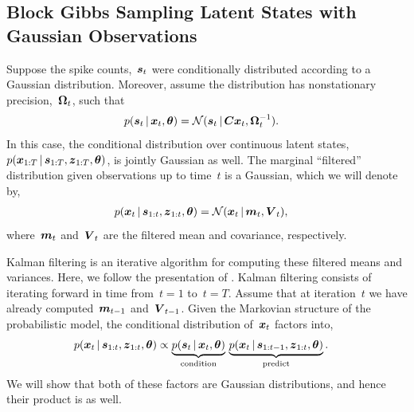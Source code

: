 \subsection{Block Gibbs Sampling Latent States with Gaussian Observations}
Suppose the spike counts,~$\boldsymbol{s}_t$ were conditionally distributed
according to a Gaussian distribution. Moreover, assume the
distribution has nonstationary precision,~$\boldsymbol{\Omega}_t$, such that
\begin{align}
  \label{eq:gauss_lkhd}
  p(\boldsymbol{s}_t \,|\, \boldsymbol{x}_t, \boldsymbol{\theta}) 
  &=
  \mathcal{N}(\boldsymbol{s}_t \,|\, \boldsymbol{C} \boldsymbol{x}_t, \boldsymbol{\Omega}_t^{-1}).
\end{align}
In this case, the conditional distribution over continuous latent
states,~${p(\boldsymbol{x}_{1:T} \,|\, \boldsymbol{s}_{1:T}, \boldsymbol{z}_{1:T}, \boldsymbol{\theta})}$, is
jointly Gaussian as well.  The marginal ``filtered'' distribution
given observations up to time~$t$ is a Gaussian, which we will denote
by,
\begin{align*}
  p(\boldsymbol{x}_t \,|\, \boldsymbol{s}_{1:t}, \boldsymbol{z}_{1:t}, \boldsymbol{\theta}) &= \mathcal{N}(\boldsymbol{x}_t \,|\, \boldsymbol{m}_t, \boldsymbol{V}_t),
\end{align*}
where~$\boldsymbol{m}_t$ and~$\boldsymbol{V}_t$ are the filtered mean and covariance, respectively.

Kalman filtering is an iterative algorithm for computing these filtered means 
and variances. 
Here, we follow the presentation of
\citet[Chapter 18]{murphy2012probabilistic}.  Kalman filtering consists
of iterating forward in time from~${t=1}$ to~${t=T}$. Assume that at iteration~$t$ we
have already computed~$\boldsymbol{m}_{t-1}$ and~$\boldsymbol{V}_{t-1}$. Given the
Markovian structure of the probabilistic model, the
conditional distribution of~$\boldsymbol{x}_t$ factors into,
\begin{align*}
  p(\boldsymbol{x}_t \,|\, \boldsymbol{s}_{1:t}, \boldsymbol{z}_{1:t}, \boldsymbol{\theta})
  &\propto
  \underbrace{p(\boldsymbol{s}_t \,|\, \boldsymbol{x}_t, \boldsymbol{\theta})}_{\text{condition}} \,
  \underbrace{p(\boldsymbol{x}_{t} \,|\, \boldsymbol{s}_{1:t-1}, \boldsymbol{z}_{1:t}, \boldsymbol{\theta})}_{\text{predict}}.
\end{align*}
We will show that both of these factors are Gaussian distributions, 
and hence their product is as well. 


